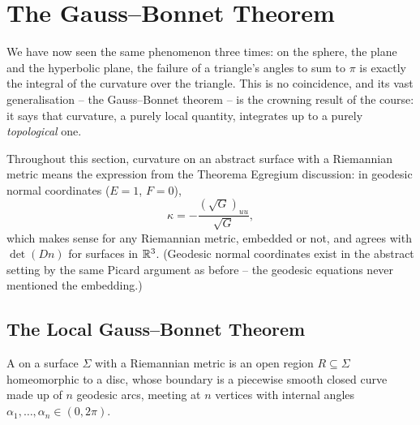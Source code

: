 \documentclass[a4paper]{scrartcl}
\begin{document}
\section{The Gauss--Bonnet Theorem}

We have now seen the same phenomenon three times: on the sphere, the plane and the hyperbolic plane, the failure of a triangle's angles to sum to $\pi$ is exactly the integral of the curvature over the triangle. This is no coincidence, and its vast generalisation -- the Gauss--Bonnet theorem -- is the crowning result of the course: it says that curvature, a purely local quantity, integrates up to a purely \emph{topological} one.

Throughout this section, curvature on an abstract surface with a Riemannian metric means the expression from the Theorema Egregium discussion: in geodesic normal coordinates ($E = 1$, $F = 0$),
$$
\kappa = -\frac{(\sqrt{G})_{uu}}{\sqrt{G}},
$$
which makes sense for any Riemannian metric, embedded or not, and agrees with $\det(Dn)$ for surfaces in $\mathbb{R}^3$. (Geodesic normal coordinates exist in the abstract setting by the same Picard argument as before -- the geodesic equations never mentioned the embedding.)

\subsection{The Local Gauss--Bonnet Theorem}

\begin{definition}
    A  on a surface $\Sigma$ with a Riemannian metric is an open region $R \subseteq \Sigma$ homeomorphic to a disc, whose boundary is a piecewise smooth closed curve made up of $n$ geodesic arcs, meeting at $n$ vertices with internal angles $\alpha_1, \dots, \alpha_n \in (0, 2\pi)$.
\end{definition}
\begin{center}
\end{center}
\end{document}
